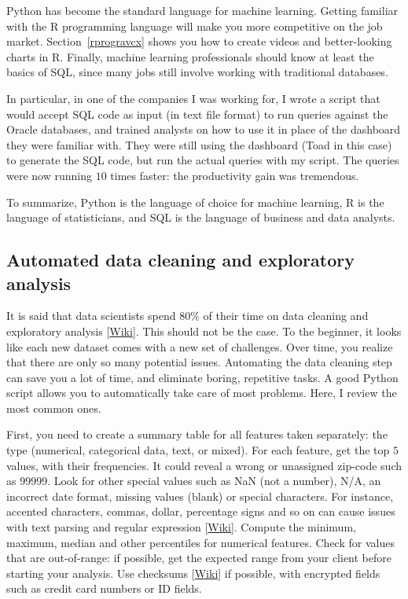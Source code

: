 \documentclass[oneside,10pt]{book}
\begin{document}
Python has become the standard language for machine learning. Getting familiar with the R programming language will make you more competitive on the job market.
 Section~\ref{rprogravcx} shows you how to create videos and better-looking charts in R. Finally, machine learning professionals should know at least the basics of SQL, since many jobs still involve working with traditional databases.

In particular, in one of the companies I was working for, I wrote a script that would accept SQL code as input (in text file format) to run queries against the Oracle databases, and trained analysts on how to use it in place of the dashboard they were familiar with. They were still using the dashboard (Toad in this case) to generate the SQL code, but run the actual queries with my script. The queries were now running $10$ times faster: the productivity gain was tremendous.

To summarize, Python is the language of choice for machine learning, R is the language of statisticians, and SQL is the language of business and data analysts.

\subsection{Automated data cleaning and exploratory analysis}

It is said that data scientists spend $80\%$ of their time on data cleaning and \textcolor{index}{exploratory analysis} [\href{https://en.wikipedia.org/wiki/Exploratory_data_analysis}{Wiki}]. This should not be the case. To the beginner, it looks like each new dataset comes with a new set of challenges.
 Over time, you realize that there are only so many potential issues. Automating the data cleaning step can save you a lot of time, and eliminate boring, repetitive tasks. A good Python script allows you to automatically take care of most problems. Here, I review the most common ones.

First, you need to create a summary table for all features taken separately: the type (numerical, categorical data, text, or mixed). For each feature, get the top $5$ values, with their frequencies. It could reveal a wrong or unassigned zip-code such as 99999. Look for other special values such as NaN (not a number), N/A, an incorrect date format, missing values (blank) or special characters. For instance,  accented characters, commas, dollar, percentage signs and so on can cause issues with text parsing  and \textcolor{index}{regular expression} [\href{https://en.wikipedia.org/wiki/Regular_expression}{Wiki}]. Compute the minimum, maximum, median and other percentiles for numerical features. Check for values that are out-of-range: if possible, get the expected range from your client before starting your analysis. Use
\textcolor{index}{checksums} [\href{https://en.wikipedia.org/wiki/Checksum}{Wiki}]
if possible, with encrypted fields such as credit card numbers or ID fields.
\end{document}
